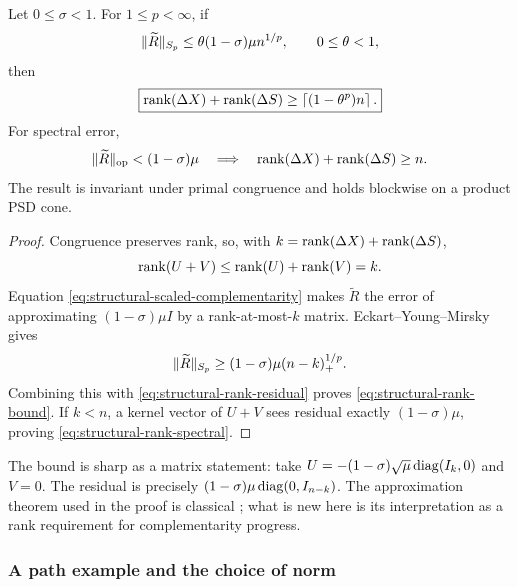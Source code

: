 \begin{theorem}
\label{thm:structural-rank-progress}
Let $0\leq\sigma<1$.  For $1\leq p<\infty$, if
\begin{equation}
 \lVert\widetilde R\rVert_{S_p}
 \leq\theta(1-\sigma)\mu n^{1/p},\qquad 0\leq\theta<1,
                                                               \label{eq:structural-rank-residual}
\end{equation}
then
\begin{equation}
 \boxed{\operatorname{rank}(\Delta X)+\operatorname{rank}(\Delta S)
 \geq\left\lceil(1-\theta^p)n\right\rceil.}             \label{eq:structural-rank-bound}
\end{equation}
For spectral error,
\begin{equation}
 \lVert\widetilde R\rVert_{\mathrm{op}}<(1-\sigma)\mu
 \quad\Longrightarrow\quad
 \operatorname{rank}(\Delta X)+\operatorname{rank}(\Delta S)\geq n.                 \label{eq:structural-rank-spectral}
\end{equation}
The result is invariant under primal congruence and holds blockwise on a
product PSD cone.
\end{theorem}

\begin{proof}
Congruence preserves rank, so, with
$k=\operatorname{rank}(\Delta X)+\operatorname{rank}(\Delta S)$,
\[
 \operatorname{rank}(U+V)\leq\operatorname{rank}(U)+\operatorname{rank}(V)=k.
\]
Equation \eqref{eq:structural-scaled-complementarity} makes
$\widetilde R$ the error of approximating $(1-\sigma)\mu I$ by a
rank-at-most-$k$ matrix.  Eckart--Young--Mirsky gives
\[
 \lVert\widetilde R\rVert_{S_p}
 \geq(1-\sigma)\mu(n-k)_+^{1/p}.
\]
Combining this with \eqref{eq:structural-rank-residual} proves
\eqref{eq:structural-rank-bound}.  If $k<n$, a kernel vector of $U+V$
sees residual exactly $(1-\sigma)\mu$, proving
\eqref{eq:structural-rank-spectral}.
\end{proof}

The bound is sharp as a matrix statement: take
$U=-(1-\sigma)\sqrt\mu\operatorname{diag}(I_k,0)$ and $V=0$.  The residual is precisely
$(1-\sigma)\mu\operatorname{diag}(0,I_{n-k})$.  The approximation theorem used in the
proof is classical \cite{structural-eckart1936-low-rank,
structural-mirsky1960-unitarily-invariant}; what is new here is its
interpretation as a rank requirement for complementarity progress.

\subsubsection{A path example and the choice of norm}

